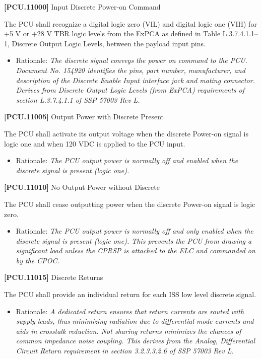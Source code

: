 \documentclass[12pt,oneside,oldfontcommands]{memoir}
\begin{document}
\textbf{[PCU.11000]} Input Discrete Power-on Command

The \gls{PCU} shall recognize a digital logic zero (VIL) and digital logic one (VIH) for +5 V or +28 V TBR\label{tbx_4} logic levels from the ExPCA as defined in Table L.3.7.4.1.1--1, Discrete Output Logic Levels, between the payload input pins.

\begin{itemize}
\item{} Rationale: \emph{The discrete signal conveys the power on command to the PCU. Document No. 154920 identifies the pins, part number, manufacturer, and description of the Discrete Enable Input interface jack and mating connector. Derives from Discrete Output Logic Levels (from ExPCA) requirements of section L.3.7.4.1.1 of SSP 57003 Rev L.}

\end{itemize}

\textbf{[PCU.11005]} Output Power with Discrete Present

The \gls{PCU} shall activate its output voltage when the discrete Power-on signal is logic one and when 120 \gls{VDC} is applied to the \gls{PCU} input.

\begin{itemize}
\item{} Rationale: \emph{The PCU output power is normally off and enabled when the discrete signal is present (logic one).}

\end{itemize}

\textbf{[PCU.11010]} No Output Power without Discrete

The \gls{PCU} shall cease outputting power when the discrete Power-on signal is logic zero.

\begin{itemize}
\item{} Rationale: \emph{The PCU output power is normally off and only enabled when the discrete signal is present (logic one). This prevents the PCU from drawing a significant load unless the CPRSP is attached to the ELC and commanded on by the CPOC.}

\end{itemize}

\textbf{[PCU.11015]} Discrete Returns

The \gls{PCU} shall provide an individual return for each \gls{ISS} low level discrete signal.

\begin{itemize}
\item{} Rationale: \emph{A dedicated return ensures that return currents are routed with supply leads, thus minimizing radiation due to differential mode currents and aids in crosstalk reduction. Not sharing returns minimizes the chances of common impedance noise coupling. This derives from the Analog, Differential Circuit Return requirement in section 3.2.3.3.2.6 of SSP 57003 Rev L.}

\end{itemize}
\end{document}
